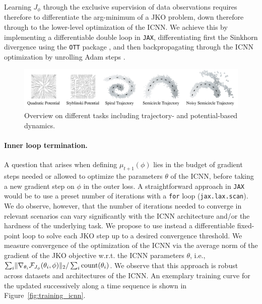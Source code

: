 Learning  $J_\phi$ through the exclusive supervision of data observations requires therefore to differentiate the arg-minimum of a \acrshort{JKO} problem, down therefore through to the lower-level optimization of the ICNN. We achieve this by implementing a differentiable double loop in \texttt{JAX}, differentiating first the Sinkhorn divergence using the \texttt{OTT} package \citep{cuturi2022optimal}, and then backpropagating through the ICNN optimization by unrolling Adam steps \citep{kingma2014adam, metz2016unrolled, lorraine2020optimizing}.

\begin{figure}[t]
\centering
\includegraphics[width=1.0\textwidth]{figures/fig_task_overview_noise.pdf}
\caption{Overview on different tasks including trajectory- and potential-based dynamics.}
\label{fig:task_overview}
\end{figure}

\paragraph{Inner loop termination.} A question that arises when defining $\mu_{t+1}(\phi)$ lies in the budget of gradient steps needed or allowed to optimize the parameters $\theta$ of the ICNN, before taking a new gradient step on $\phi$ in the outer loss. A straightforward approach in \texttt{JAX} \citep{jax2018github} would be to use a preset number of iterations with a \texttt{for} loop (\texttt{jax.lax.scan}). 
We do observe, however, that the number of iterations needed to converge in relevant scenarios can vary significantly with the ICNN architecture and/or the hardness of the underlying task.
We propose to use instead a differentiable fixed-point loop to solve each \acrshort{JKO} step up to a desired convergence threshold.
We measure convergence of the optimization of the ICNN via the average norm of the gradient of the \acrshort{JKO} objective w.r.t. the ICNN parameters $\theta$, i.e., $\sum_i \lVert\nabla_{\theta_i}\mathcal{F}_{J_\phi}(\theta_i, \phi)\rVert_2/\sum_i \text{count}(\theta_i)$.
We observe that this approach is robust across datasets and architectures of the ICNN. An exemplary training curve for the  updated successively along a time sequence is shown in Figure~\ref{fig:training_icnn}.


